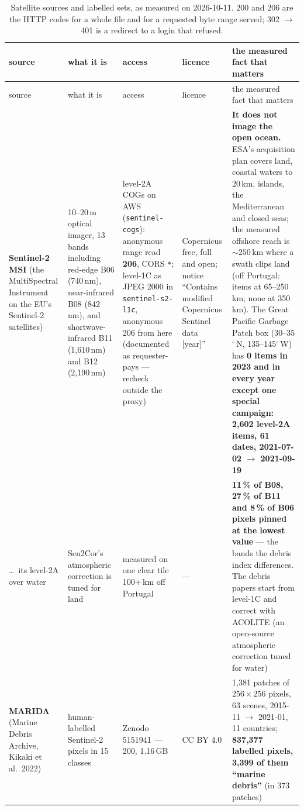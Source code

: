 \documentclass[10pt]{article}
\newcommand{\code}[1]{\texttt{#1}}
\begin{document}
{\setlength{\tabcolsep}{2pt}\scriptsize
\begin{longtable}{@{}L{2.3cm}L{3.0cm}L{3.2cm}L{1.9cm}L{5.2cm}@{}}
\caption{Satellite sources and labelled sets, as measured on 2026-10-11. 200 and 206 are the HTTP codes for a whole file and for a requested byte range served; 302 $\to$ 401 is a redirect to a login that refused.} \label{tab:sat}\\
\toprule
source & what it is & access & licence & the measured fact that matters \\
\midrule
\endfirsthead
\toprule
source & what it is & access & licence & the measured fact that matters \\
\midrule
\endhead
\textbf{Sentinel-2 MSI} (the MultiSpectral Instrument on the EU's Sentinel-2 satellites) & 10--20\,m optical
imager, 13 bands including red-edge B06 (740\,nm), near-infrared B08 (842\,nm), and shortwave-infrared B11
(1,610\,nm) and B12 (2,190\,nm) & level-2A COGs on AWS (\code{sentinel-cogs}): anonymous range read
\textbf{206}, CORS \code{*}; level-1C as JPEG 2000 in \code{sentinel-s2-l1c}, anonymous 206 from here (documented
as requester-pays --- recheck outside the proxy) & Copernicus free, full and open; notice ``Contains modified
Copernicus Sentinel data [year]'' & \textbf{It does not image the open ocean.} ESA's acquisition plan covers land,
coastal waters to 20\,km, islands, the Mediterranean and closed seas; the measured offshore reach is $\sim 250$\,km
where a swath clips land (off Portugal: items at 65--250\,km, none at 350\,km). The Great Pacific Garbage Patch box
(30--35$^\circ$\,N, 135--145$^\circ$\,W) has \textbf{0 items in 2023 and in every year except one special
campaign: 2,602 level-2A items, 61 dates, 2021-07-02 $\to$ 2021-09-19} \\
\addlinespace
\dots\ its level-2A over water & Sen2Cor's atmospheric correction is tuned for land & measured on one clear tile
100+\,km off Portugal & --- & \textbf{11\,\% of B08, 27\,\% of B11 and 8\,\% of B06 pixels pinned at the lowest
value} --- the bands the debris index differences. The debris papers start from level-1C and correct with ACOLITE
(an open-source atmospheric correction tuned for water) \\
\addlinespace
\textbf{MARIDA} (Marine Debris Archive, Kikaki et al.\ 2022) & human-labelled Sentinel-2 pixels in 15 classes &
Zenodo 5151941 --- 200, 1.16\,GB & CC BY 4.0 & 1,381 patches of $256 \times 256$ pixels, 63 scenes, 2015-11 $\to$
2021-01, 11 countries; \textbf{837,377 labelled pixels, 3,399 of them ``marine debris''} (in 373 patches) \\

\end{longtable}}
\end{document}
